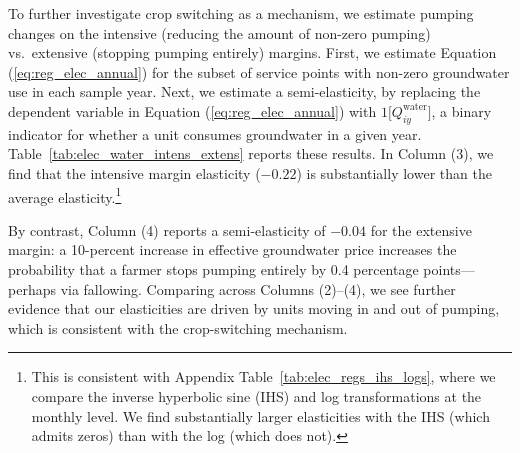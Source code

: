 To further investigate crop switching as a mechanism, we estimate pumping changes on the intensive (reducing the amount of non-zero pumping) vs.\ extensive (stopping pumping entirely) margins. First, we estimate Equation (\ref{eq:reg_elec_annual}) for the subset of service points with non-zero groundwater use in each sample year. Next, we estimate a semi-elasticity, by replacing the dependent variable in Equation (\ref{eq:reg_elec_annual}) with $1\big[Q^{\text{water}}_{iy}\big]$, a binary indicator for whether a unit consumes groundwater in a given year. Table~\ref{tab:elec_water_intens_extens} reports these results. In Column (3), we find that the intensive margin elasticity ($-0.22$) is substantially lower than the average elasticity.\footnote{This is consistent with Appendix Table~\ref{tab:elec_regs_ihs_logs}, where we compare the inverse hyperbolic sine (IHS) and log transformations at the monthly level. We find substantially larger elasticities with the IHS (which admits zeros) than with the log (which does not).}
 
By contrast, Column (4) reports a semi-elasticity of $-0.04$ for the extensive margin: a 10-percent increase in effective groundwater price increases the probability that a farmer stops pumping entirely by 0.4 percentage points---perhaps via fallowing. Comparing across Columns (2)--(4), we see further evidence that our elasticities are driven by units moving in and out of pumping, which is consistent with the crop-switching mechanism.


